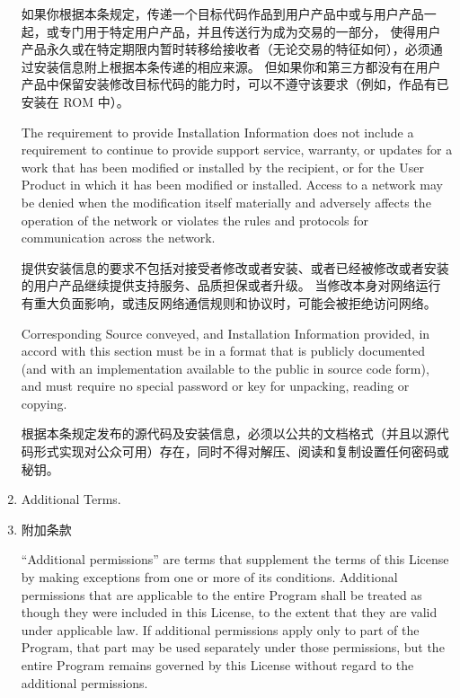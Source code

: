 \documentclass[11pt]{article}
\begin{document}
\begin{enumerate}
        如果你根据本条规定，传递一个目标代码作品到用户产品中或与用户产品一起，或专门用于特定用户产品，并且传送行为成为交易的一部分，
        使得用户产品永久或在特定期限内暂时转移给接收者（无论交易的特征如何），必须通过安装信息附上根据本条传递的相应来源。
        但如果你和第三方都没有在用户产品中保留安装修改目标代码的能力时，可以不遵守该要求（例如，作品有已安装在 ROM 中）。

        The requirement to provide Installation Information does not include a
        requirement to continue to provide support service, warranty, or updates
        for a work that has been modified or installed by the recipient, or for
        the User Product in which it has been modified or installed.  Access to a
        network may be denied when the modification itself materially and
        adversely affects the operation of the network or violates the rules and
        protocols for communication across the network.

        提供安装信息的要求不包括对接受者修改或者安装、或者已经被修改或者安装的用户产品继续提供支持服务、品质担保或者升级。
        当修改本身对网络运行有重大负面影响，或违反网络通信规则和协议时，可能会被拒绝访问网络。

        Corresponding Source conveyed, and Installation Information provided,
        in accord with this section must be in a format that is publicly
        documented (and with an implementation available to the public in
        source code form), and must require no special password or key for
        unpacking, reading or copying.

        根据本条规定发布的源代码及安装信息，必须以公共的文档格式（并且以源代码形式实现对公众可用）存在，同时不得对解压、阅读和复制设置任何密码或秘钥。

  \item Additional Terms.
  \item 附加条款

        ``Additional permissions'' are terms that supplement the terms of this
        License by making exceptions from one or more of its conditions.
        Additional permissions that are applicable to the entire Program shall
        be treated as though they were included in this License, to the extent
        that they are valid under applicable law.  If additional permissions
        apply only to part of the Program, that part may be used separately
        under those permissions, but the entire Program remains governed by
        this License without regard to the additional permissions.


\end{enumerate}
\end{document}
